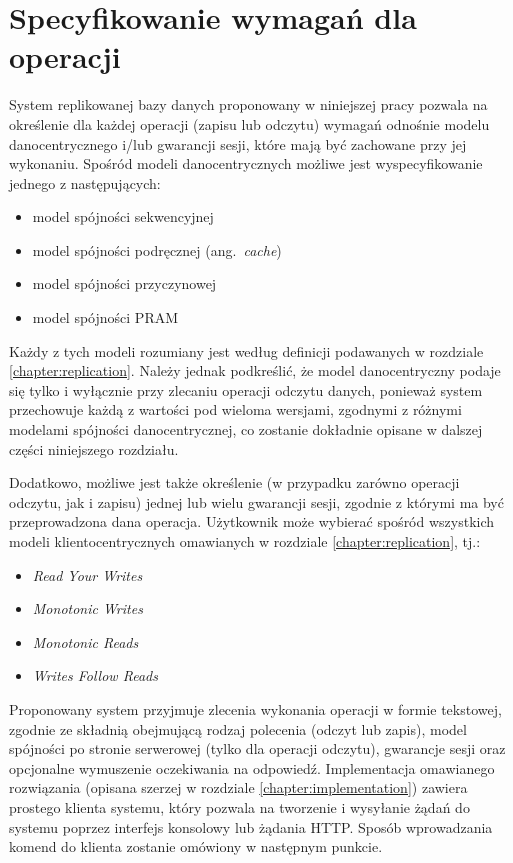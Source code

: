 \section{Specyfikowanie wymagań dla operacji} \label{section:requirements_specifying}

System replikowanej bazy danych proponowany w niniejszej pracy pozwala na określenie dla każdej operacji (zapisu lub odczytu) wymagań odnośnie modelu danocentrycznego i/lub gwarancji sesji, które mają być zachowane przy jej wykonaniu. Spośród modeli danocentrycznych możliwe jest wyspecyfikowanie jednego z następujących:

\begin{itemize}
    \item model spójności sekwencyjnej
    \item model spójności podręcznej (ang.\ \textit{cache})
    \item model spójności przyczynowej
    \item model spójności PRAM
\end{itemize}

Każdy z tych modeli rozumiany jest według definicji podawanych w rozdziale \ref{chapter:replication}. Należy jednak podkreślić, że model danocentryczny podaje się tylko i wyłącznie przy zlecaniu operacji odczytu danych, ponieważ system przechowuje każdą z wartości pod wieloma wersjami, zgodnymi z różnymi modelami spójności danocentrycznej, co zostanie dokładnie opisane w dalszej części niniejszego rozdziału.

Dodatkowo, możliwe jest także określenie (w przypadku zarówno operacji odczytu, jak i zapisu) jednej
lub wielu gwarancji sesji, zgodnie z którymi ma być przeprowadzona dana operacja. Użytkownik może
wybierać spośród wszystkich modeli klientocentrycznych omawianych w rozdziale
\ref{chapter:replication}, tj.:

\begin{itemize}
    \item \textit{Read Your Writes}
    \item \textit{Monotonic Writes}
    \item \textit{Monotonic Reads}
    \item \textit{Writes Follow Reads}
\end{itemize}

Proponowany system przyjmuje zlecenia wykonania operacji w formie tekstowej, zgodnie ze składnią obejmującą rodzaj polecenia (odczyt lub zapis), model spójności po stronie serwerowej (tylko dla operacji odczytu), gwarancje sesji oraz opcjonalne wymuszenie oczekiwania na odpowiedź. Implementacja omawianego rozwiązania (opisana szerzej w rozdziale \ref{chapter:implementation}) zawiera prostego klienta systemu, który pozwala na tworzenie i wysyłanie żądań do systemu poprzez interfejs konsolowy lub żądania HTTP. Sposób wprowadzania komend do klienta zostanie omówiony w następnym punkcie.

